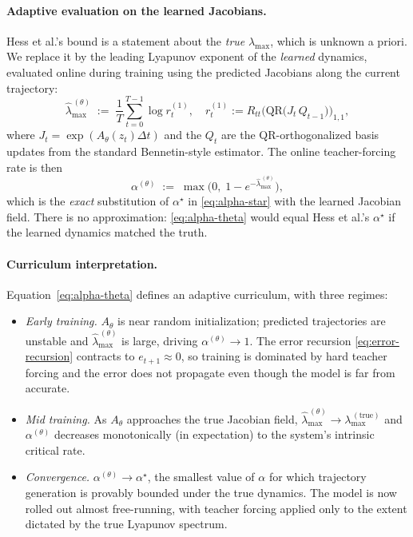 \paragraph{Adaptive evaluation on the learned Jacobians.}
Hess et al.'s bound is a statement about the \emph{true}
$\lambda_{\max}$, which is unknown a priori. We replace it by the
leading Lyapunov exponent of the \emph{learned} dynamics, evaluated
online during training using the predicted Jacobians along the current
trajectory:
%
\begin{equation}
  \widehat{\lambda}_{\max}^{\,(\theta)}
  \;:=\;
  \frac{1}{T}\sum_{t=0}^{T-1} \log r_t^{(1)},
  \quad
  r_t^{(1)} := R_{tt}\bigl(\mathrm{QR}\!\bigl(J_t\,Q_{t-1}\bigr)\bigr)_{1,1},
  \label{eq:lyap-online}
\end{equation}
%
where $J_t = \exp(A_\theta(z_t)\Delta t)$ and the $Q_t$ are the
QR-orthogonalized basis updates from the standard Bennetin-style
estimator. The online teacher-forcing rate is then
%
\begin{equation}
  \alpha^{(\theta)} \;:=\; \max\!\bigl(0,\;1 - e^{-\widehat{\lambda}_{\max}^{\,(\theta)}}\bigr),
  \label{eq:alpha-theta}
\end{equation}
%
which is the \emph{exact} substitution of $\alpha^\star$ in
\eqref{eq:alpha-star} with the learned Jacobian field. There is no
approximation: \eqref{eq:alpha-theta} would equal Hess et al.'s
$\alpha^\star$ if the learned dynamics matched the truth.

\paragraph{Curriculum interpretation.}
Equation~\eqref{eq:alpha-theta} defines an adaptive curriculum, with
three regimes:
\begin{itemize}
  \item \emph{Early training.} $A_\theta$ is near random
  initialization; predicted trajectories are unstable and
  $\widehat{\lambda}_{\max}^{\,(\theta)}$ is large, driving
  $\alpha^{(\theta)} \to 1$. The error recursion
  \eqref{eq:error-recursion} contracts to
  $e_{t+1} \approx 0$, so training is dominated by hard teacher
  forcing and the error does not propagate even though the model
  is far from accurate.
  \item \emph{Mid training.} As $A_\theta$ approaches the true
  Jacobian field, $\widehat{\lambda}_{\max}^{\,(\theta)} \to
  \lambda_{\max}^{\,(\text{true})}$ and $\alpha^{(\theta)}$
  decreases monotonically (in expectation) to the system's
  intrinsic critical rate.
  \item \emph{Convergence.} $\alpha^{(\theta)} \to \alpha^\star$,
  the smallest value of $\alpha$ for which trajectory generation
  is provably bounded under the true dynamics. The model is now
  rolled out almost free-running, with teacher forcing applied
  only to the extent dictated by the true Lyapunov spectrum.
\end{itemize}


